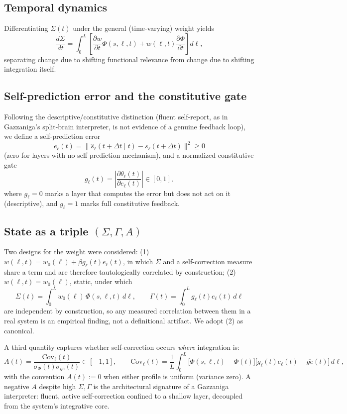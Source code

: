 \documentclass[11pt]{article}
\begin{document}
\subsection{Temporal dynamics}
Differentiating $\Sigma(t)$ under the general (time-varying) weight yields
\[
\frac{d\Sigma}{dt} = \int_0^L \left[\frac{\partial w}{\partial t}\Phi(s,\ell,t) + w(\ell,t)\frac{\partial \Phi}{\partial t}\right]d\ell,
\]
separating change due to shifting functional relevance from change due to shifting integration itself.

\subsection{Self-prediction error and the constitutive gate}
Following the descriptive/constitutive distinction (fluent self-report, as in Gazzaniga's split-brain interpreter, is not evidence of a genuine feedback loop), we define a self-prediction error
\[
e_\ell(t) = \big\|\hat s_\ell(t+\Delta t\mid t) - s_\ell(t+\Delta t)\big\|^2 \ge 0
\]
(zero for layers with no self-prediction mechanism), and a normalized constitutive gate
\[
g_\ell(t) = \left|\frac{\partial \theta_\ell(t)}{\partial e_\ell(t)}\right| \in [0,1],
\]
where $g_\ell=0$ marks a layer that computes the error but does not act on it (descriptive), and $g_\ell=1$ marks full constitutive feedback.

\subsection{State as a triple $(\Sigma,\Gamma,A)$}
Two designs for the weight were considered: (1) $w(\ell,t)=w_0(\ell)+\beta g_\ell(t)e_\ell(t)$, in which $\Sigma$ and a self-correction measure share a term and are therefore tautologically correlated by construction; (2) $w(\ell,t)=w_0(\ell)$, static, under which
\[
\Sigma(t) = \int_0^L w_0(\ell)\,\Phi(s,\ell,t)\,d\ell, \qquad \Gamma(t) = \int_0^L g_\ell(t)e_\ell(t)\,d\ell
\]
are independent by construction, so any measured correlation between them in a real system is an empirical finding, not a definitional artifact. We adopt (2) as canonical.

A third quantity captures whether self-correction occurs \emph{where} integration is:
\[
A(t) = \frac{\mathrm{Cov}_\ell(t)}{\sigma_\Phi(t)\sigma_{ge}(t)} \in [-1,1], \qquad \mathrm{Cov}_\ell(t)=\frac{1}{L}\int_0^L\big[\Phi(s,\ell,t)-\bar\Phi(t)\big]\big[g_\ell(t)e_\ell(t)-\overline{ge}(t)\big]\,d\ell,
\]
with the convention $A(t):=0$ when either profile is uniform (variance zero). A negative $A$ despite high $\Sigma,\Gamma$ is the architectural signature of a Gazzaniga interpreter: fluent, active self-correction confined to a shallow layer, decoupled from the system's integrative core.
\end{document}
